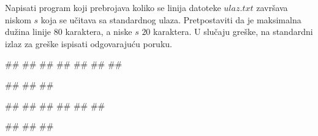 \begin{Exercise}[label=p3_04] 
 Napisati program koji prebrojava koliko se linija datoteke $ulaz.txt$ završava niskom $s$ 
 koja se učitava sa standardnog ulaza. Pretpostaviti da je maksimalna dužina linije $80$ karaktera, a niske $s$ $20$ karaktera.
 U slučaju greške, na standardni izlaz za greške ispisati odgovarajuću poruku.

\begin{miditest}
\begin{upotreba}{1}
##
##
##
##
##
##
##

#\naslovInt#
##
##
\end{upotreba}
\end{miditest}
\begin{miditest}
\begin{upotreba}{2}
##
##
##
##
##
##

#\naslovInt#
##
##
\end{upotreba}
\end{miditest}
\end{Exercise}
\begin{Answer}[ref=p3_04]
\end{Answer}


